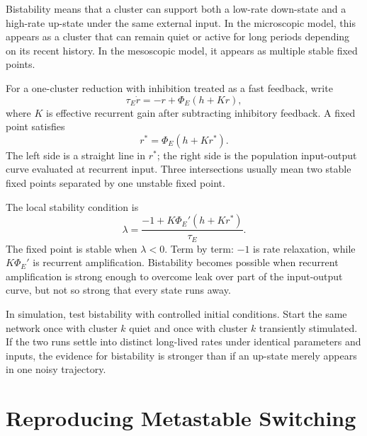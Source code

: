 Bistability means that a cluster can support both a low-rate down-state and a high-rate up-state under the same external input. In the microscopic model, this appears as a cluster that can remain quiet or active for long periods depending on its recent history. In the mesoscopic model, it appears as multiple stable fixed points.

For a one-cluster reduction with inhibition treated as a fast feedback, write
%
\begin{equation}
  \tau_E \dot r
  =
  -r + \Phi_E\!\left(h + K r\right),
  \label{eq:ch21-one-cluster-bistability}
\end{equation}
%
where $K$ is effective recurrent gain after subtracting inhibitory feedback. A fixed point satisfies
%
\begin{equation}
  r^*=\Phi_E(h+Kr^*).
  \label{eq:ch21-one-cluster-fixed-point}
\end{equation}
%
The left side is a straight line in $r^*$; the right side is the population input-output curve evaluated at recurrent input. Three intersections usually mean two stable fixed points separated by one unstable fixed point.

The local stability condition is
%
\begin{equation}
  \lambda
  =
  \frac{-1+K\Phi_E'(h+Kr^*)}{\tau_E}.
  \label{eq:ch21-one-cluster-stability}
\end{equation}
%
The fixed point is stable when $\lambda<0$. Term by term: $-1$ is rate relaxation, while $K\Phi_E'$ is recurrent amplification. Bistability becomes possible when recurrent amplification is strong enough to overcome leak over part of the input-output curve, but not so strong that every state runs away.

In simulation, test bistability with controlled initial conditions. Start the same network once with cluster $k$ quiet and once with cluster $k$ transiently stimulated. If the two runs settle into distinct long-lived rates under identical parameters and inputs, the evidence for bistability is stronger than if an up-state merely appears in one noisy trajectory.

\section{Reproducing Metastable Switching}
\label{sec:reproducing-metastable-switching}

